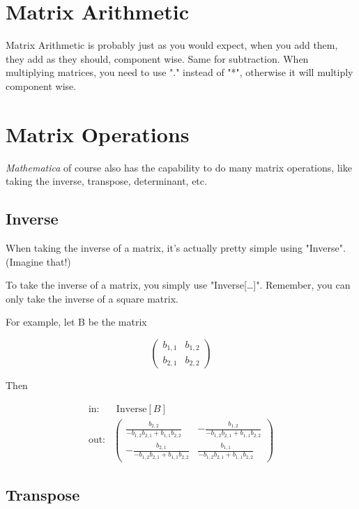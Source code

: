 \documentclass[11pt,letterpaper,twoside,titlepage]{report}
\newcommand{\Mathematica}{\textit{Mathematica} }
\begin{document}
			\section{Matrix Arithmetic}
					
				Matrix Arithmetic is probably just as you would expect, when you add them, they add as they should, component wise.  Same for subtraction.  When multiplying matrices, you need to use "." instead of "*", otherwise it will multiply component wise.
						
			\section{Matrix Operations}
						
				\Mathematica of course also has the capability to do many matrix operations, like taking the inverse, transpose, determinant, etc.
						
				\subsection{Inverse}
								
							When taking the inverse of a matrix, it's actually pretty simple using "Inverse". (Imagine that!)
									
							To take the inverse of a matrix, you simply use "Inverse[\dots]".  Remember, you can only take the inverse of a square matrix.
									
							For example, let B be the matrix 
									
							\[ \left(
\begin{array}{cc}
 b_{1,1} & b_{1,2} \\
 b_{2,1} & b_{2,2}
\end{array}
\right) \]

							Then 
									
							\begin{align*}
										\text{in:}& \text{ Inverse}[B] \\
										\text{out:}& \left(
\begin{array}{cc}
 \frac{b_{2,2}}{-b_{1,2} b_{2,1}+b_{1,1} b_{2,2}} & -\frac{b_{1,2}}{-b_{1,2} b_{2,1}+b_{1,1} b_{2,2}} \\
 -\frac{b_{2,1}}{-b_{1,2} b_{2,1}+b_{1,1} b_{2,2}} & \frac{b_{1,1}}{-b_{1,2} b_{2,1}+b_{1,1} b_{2,2}}
\end{array}
\right)
							\end{align*}
									
				\subsection{Transpose}
								
\end{document}
